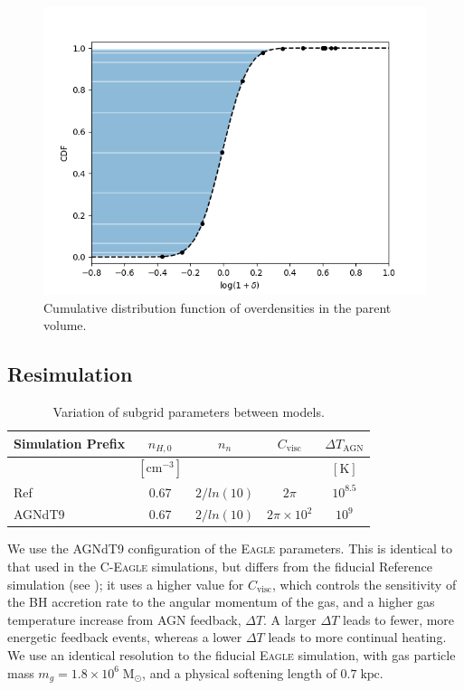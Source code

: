 \begin{figure}
	\includegraphics[width=\columnwidth]{images/CDF.png}
    \caption{Cumulative distribution function of overdensities in the parent volume.}
    \label{fig:CDF}
\end{figure}

\subsection{Resimulation}


\begin{table}
	\centering
	\caption{Variation of subgrid parameters between models. }
	\label{tab:example_table}
	\begin{tabular}{lcccc}
		\hline
		\textbf{Simulation Prefix} & $n_{H,0}$ & $n_{n}$ & $C_{\mathrm{visc}}$ & $\Delta T_{\mathrm{AGN}}$\\
		\hline
     & $\mathrm{[cm^{-3}]}$ & & & $\mathrm{[K]}$ \\
		\hline
		Ref & 0.67 & $2/ln(10)$ & $2 \pi$ & $10^{8.5}$ \\
		AGNdT9 & 0.67 & $2/ln(10)$ & $2 \pi \times 10^{2}$ & $10^{9}$ \\
		\hline
	\end{tabular}
\end{table}


We use the AGNdT9 configuration of the \textsc{Eagle} parameters.
This is identical to that used in the \textsc{C-Eagle} simulations, but differs from the fiducial Reference simulation (see ); it uses a higher value for $C_{\mathrm{visc}}$, which controls the sensitivity of the BH accretion rate to the angular momentum of the gas, and a higher gas temperature increase from AGN feedback, $\Delta T$.
A larger $\Delta T$ leads to fewer, more energetic feedback events, whereas a lower $\Delta T$ leads to more continual heating.
We use an identical resolution to the fiducial \textsc{Eagle} simulation, with gas particle mass $m_{g} = 1.8 \times 10^6 \; \mathrm{M_{\odot}}$, and a physical softening length of $0.7 \; \mathrm{kpc}$.


